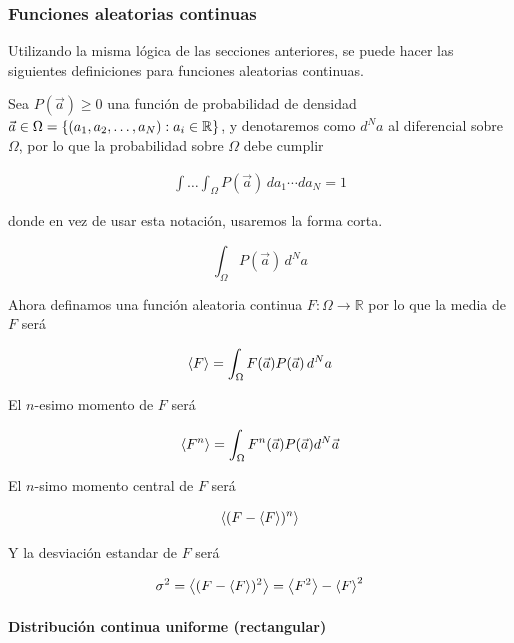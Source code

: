 \subsubsection{Funciones aleatorias continuas}
Utilizando la misma lógica de las secciones anteriores, se puede
hacer las siguientes definiciones para funciones aleatorias continuas.

Sea $P(\vec{a}) \geq 0$ una función de probabilidad de densidad
$\vec{a} \in \Omega = \left\{(a_{1}, a_{2}, \ldots, a_{N}): a_i \in
\mathbb{R} \right\}$, y denotaremos como $d^N a$ al diferencial sobre $\Omega$,
por lo que la probabilidad sobre $\Omega$ debe cumplir

\begin{gather}
  \int\dots\int_{\Omega}  P(\vec{a})\, da_1 \cdots d a_N = 1
  \label{eq:prob-aleatoria-continua}
\end{gather}

donde en vez de usar esta notación, usaremos la forma corta.

\begin{equation}
  \int_\Omega P(\vec{a})\,d^Na
  \label{eq:eq-prob-random-continue}
\end{equation}

Ahora definamos una función aleatoria continua $F: \Omega \to \mathbb{R}$
por lo que la media de $F$ será

\begin{equation}
  \left\langle F \right\rangle = \int_\Omega F(\vec{a}) P(\vec{a})\, d^Na
  \label{eq:mean-con-mult}
\end{equation}

El $n$-esimo momento de $F$ será

\begin{equation}
  \left\langle F^n \right\rangle = \int_\Omega F^n(\vec{a}) P(\vec{a}) d^N\vec{a}
  \label{eq:moment-con-mult}
\end{equation}

El $n$-simo momento central de $F$ será

\begin{equation}
  \left\langle (F - \left\langle F \right\rangle)^n \right\rangle
  \label{eq:n-central-moment-con-mult}
\end{equation}

Y la desviación estandar de $F$ será

\begin{equation}
  \sigma^2 = \left\langle (F - \left\langle F \right\rangle)^2 \right\rangle = \left\langle F^2 \right\rangle - \left\langle F \right\rangle^2
  \label{eq:std-con-mult}
\end{equation}

\paragraph{Distribución continua uniforme (rectangular)}

